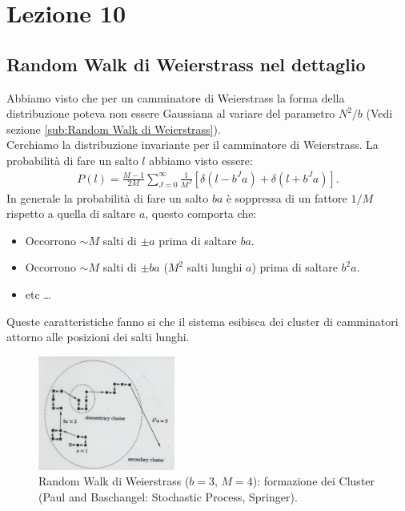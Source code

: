 \section{Lezione 10}%
\label{sub:Lezione 10}
\subsection{Random Walk di Weierstrass nel dettaglio}%
\label{sub:Random Walk di Weierstrass nel dettaglio}
Abbiamo visto che per un camminatore di Weierstrass la forma della distribuzione poteva non essere Gaussiana al variare del parametro $N^2 / b$ (Vedi sezione \ref{sub:Random Walk di Weierstrass}). \\
Cerchiamo la distribuzione invariante per il camminatore di Weierstrass. La probabilità di fare un salto $l$ abbiamo visto essere:
\[\begin{aligned}
    P(l) = \frac{M-1}{2M}\sum_{J=0}^{\infty} \frac{1}{M^J}\left[\delta (l-b^Ja) + \delta (l+b^Ja) \right]
.\end{aligned}\]
In generale la probabilità di fare un salto $ba$ è soppressa di un fattore $1 /M$ rispetto a quella di saltare $a$, questo comporta che:
\begin{itemize}
    \item Occorrono $\sim M$ salti di $\pm a$ prima di saltare $ba$.
    \item Occorrono $\sim M$ salti di $\pm ba$ ($M^2$ salti lunghi $a$) prima di saltare $b^2a$.
    \item etc \ldots
\end{itemize}
Queste caratteristiche fanno si che il sistema esibisca dei cluster di camminatori attorno alle posizioni dei salti lunghi.
\begin{figure}[H]
    \centering
    \includegraphics[width=0.4\textwidth]{figures/10_RWWeierstrass.png}
    \caption{\scriptsize Random Walk di Weierstrass ($b=3$, $M=4$): formazione dei Cluster (Paul and Baschangel: Stochastic Process, Springer).}
    \label{fig:figures-10_RWWeierstrass-png}
\end{figure}
\noindent
